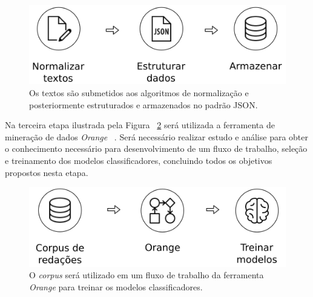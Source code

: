 \begin{figure}[H]
\begin{center}
    \includegraphics[scale=0.75]{images/metodologia_2.png}
\end{center}
\caption{Os textos são submetidos aos algoritmos de normalização e posteriormente estruturados e armazenados no padrão JSON.}
\label{fig:metodologia_2}
\end{figure}

Na terceira etapa ilustrada pela Figura ~\ref{fig:metodologia_3} será utilizada a ferramenta de mineração de dados \textit{Orange} ~\cite{JMLR:demsar13a}. Será necessário realizar estudo e análise para obter o conhecimento necessário para desenvolvimento de um fluxo de trabalho, seleção e treinamento dos modelos classificadores, concluindo todos os objetivos propostos nesta etapa.

\begin{figure}[H]
\begin{center}
    \includegraphics[scale=0.75]{images/metodologia_3.png}
\end{center}
\caption{O \textit{corpus} será utilizado em um fluxo de trabalho da ferramenta \textit{Orange} para treinar os modelos classificadores.}
\label{fig:metodologia_3}
\end{figure}

